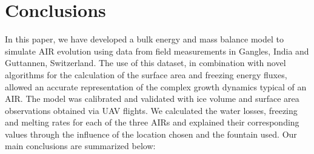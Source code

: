 \documentclass[utf8]{frontiersSCNS}
\begin{document}
\section{Conclusions}

In this paper, we have developed a bulk energy and mass balance model to simulate AIR evolution using data from
field measurements in Gangles, India and Guttannen, Switzerland. The use of this dataset, in combination with
novel algorithms for the calculation of the surface area and freezing energy fluxes, allowed an accurate
representation of the complex growth dynamics typical of an AIR. The model was calibrated and validated with ice
volume and surface area observations obtained via UAV flights. We calculated the water losses, freezing and
melting rates for each of the three AIRs and explained their corresponding values through the influence of the
location chosen and the fountain used. Our main conclusions are summarized below:
\end{document}
